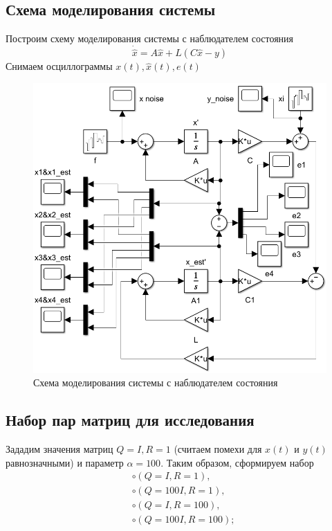 \documentclass[a4paper, 12pt]{article}
\begin{document}
    \subsection{Схема моделирования системы}
    Построим схему моделирования системы с наблюдателем состояния
    $$\dot{\hat{x}}=A\hat{x}+L\left( C\hat{x}-y \right)$$
    Снимаем осциллограммы $x(t),\hat{x}(t),e(t)$
    \begin{figure}[H]
        \centering
        \includegraphics[scale=0.45]{2task_scheme.png}
        \captionsetup{skip=0pt}
        \caption{Схема моделирования системы с наблюдателем состояния}
        \label{fig:2task_scheme}
    \end{figure}


    \subsection{Набор пар матриц для исследования}
    Зададим значения матриц $Q=I,R=1$ (считаем помехи для $x(t)$ и $y(t)$ равнозначными)
    и параметр $\alpha=100$. Таким образом, сформируем набор
    \begin{align*}
        &\circ \left( Q=I, R=1 \right),\\
        &\circ \left( Q=100I, R=1 \right),\\
        &\circ \left( Q=I, R=100 \right),\\
        &\circ \left( Q=100I, R=100 \right);
    \end{align*}
\end{document}
